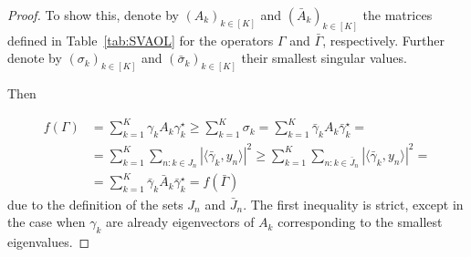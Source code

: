 \documentclass[11pt, onecolumn, journal,compsoc]{IEEEtran}
\newcommand\ip[2]{\langle #1, #2\rangle}
\newcommand\bGamma{\bar\Gamma}
\newcommand\bgamma{\bar\gamma}
\theoremstyle{plain}
\theoremstyle{remark}
\begin{document}
\begin{proof}
 To show this, denote by $(A_k)_{k\in [K]}$ and $(\bar A_k)_{k\in [K]}$ the matrices defined in Table~\ref{tab:SVAOL} for the operators $\Gamma$ and $\bGamma$, respectively. Further denote by $(\sigma_k)_{k\in[K]}$ and $(\bar\sigma_k)_{k\in[K]}$ their smallest singular values.

Then

\begin{align*}
	f(\Gamma) & = \sum_{k=1}^K \gamma_k A_k \gamma_k^\star \geq \sum_{k=1}^K \sigma_k = \sum_{k=1}^K \bgamma_k A_k\bgamma_k^\star =\\
	&= \sum_{k=1}^K \sum_{n\colon k\in J_n} |\ip{\bgamma_k}{y_n}|^2 \geq \sum_{k=1}^K \sum_{n\colon k\in \bar J_n} |\ip{\bgamma_k}{y_n}|^2 =\\
	&= \sum_{k=1}^K \bgamma_k \bar A_k \bgamma_k^\star = f(\bGamma)
	\end{align*}
due to the definition of the sets $J_n$ and $\bar J_n$.
The first inequality is strict, except in the case when $\gamma_k$ are already eigenvectors of $A_k$ corresponding to the smallest eigenvalues.
\end{proof}
\end{document}
